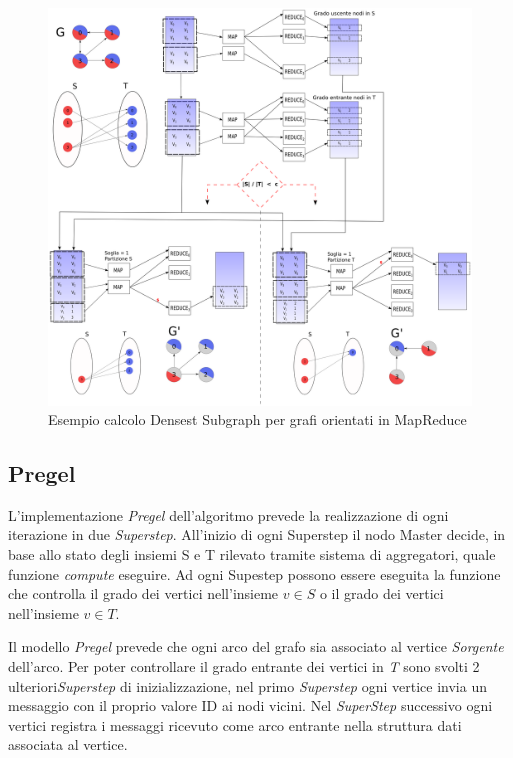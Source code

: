 \documentclass[LaM,binding=0.6cm]{sapthesis}
\begin{document}
\begin{figure}
\centering	
 \includegraphics[width=1\textwidth]{MR-denesestD}
\caption{Esempio calcolo Densest Subgraph per grafi orientati in MapReduce}
\label{fig:MRDENSESESTD}
\end{figure}

\subsection{Pregel}

L'implementazione \textit{Pregel} dell'algoritmo prevede la realizzazione di ogni iterazione in due \textit{Superstep}.
 All'inizio di ogni Superstep il nodo Master decide, in base allo stato degli insiemi S e T rilevato tramite sistema di aggregatori, quale funzione \textit{compute} eseguire. Ad ogni Supestep possono essere eseguita la funzione che controlla il grado dei vertici nell'insieme \textit{$v \in S$} o il grado dei vertici nell'insieme \textit{$v \in T$}. 

Il modello \textit{Pregel} prevede che ogni arco del grafo sia associato al vertice \textit{Sorgente} dell'arco. Per poter controllare il grado entrante dei vertici in \textit{T} sono svolti 2 ulteriori\textit{Superstep} di inizializzazione, nel primo \textit{Superstep} ogni vertice invia un messaggio con il proprio valore ID ai nodi vicini. Nel \textit{SuperStep} successivo ogni vertici registra i messaggi ricevuto come arco entrante nella struttura dati associata al vertice.
\end{document}
